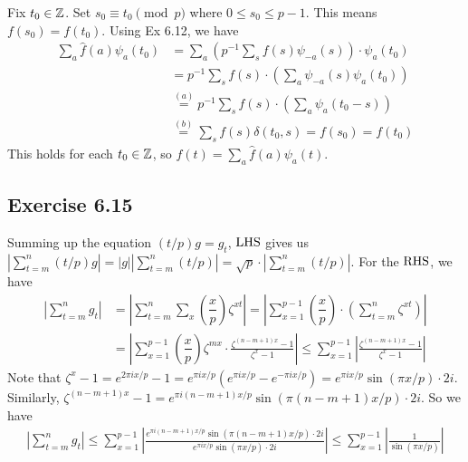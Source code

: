 \documentclass[../I&R.tex]{subfiles}
\begin{document}
Fix $t_0\in\mathbb{Z}$. Set $s_0\equiv t_0 \pmod{p}$ where $0\leq s_0\leq p-1$. This means $f(s_0)=f(t_0)$. Using Ex 6.12, we have
\begin{align*}
\sum_a \hat{f}(a)\psi_a(t_0) &= \sum_a\left(p^{-1}\sum_s f(s)\psi_{-a}(s)\right)\cdot\psi_a(t_0) \\
&= p^{-1} \sum_s f(s)\cdot\left(\sum_a \psi_{-a}(s)\psi_a(t_0)\right) \\
&\overset{(a)}{=} p^{-1} \sum_s f(s)\cdot\left(\sum_a \psi_a(t_0-s)\right) \\
&\overset{(b)}{=} \sum_s f(s)\delta(t_0,s) = f(s_0)=f(t_0)
\end{align*}
This holds for each $t_0\in\mathbb{Z}$, so $f(t)=\sum_a \hat{f}(a)\psi_a(t)$.

\subsection*{Exercise 6.15}

Summing up the equation $(t/p)g=g_t$, $\operatorname{LHS}$ gives us $|\sum_{t=m}^n (t/p)g|=|g||\sum_{t=m}^n (t/p)|=\sqrt{p}\cdot|\sum_{t=m}^n (t/p)|$. For the $\operatorname{RHS}$, we have
\begin{align*}
\left|\sum_{t=m}^n g_t\right| &= \left|\sum_{t=m}^n \sum_x \left(\dfrac{x}{p}\right)\zeta^{xt}\right| = \left| \sum_{x=1}^{p-1} \left(\dfrac{x}{p}\right)\cdot\left(\sum_{t=m}^n \zeta^{xt}\right) \right| \\
&= \left|\sum_{x=1}^{p-1} \left(\dfrac{x}{p}\right)\zeta^{mx}\cdot\frac{\zeta^{(n-m+1)x}-1}{\zeta^x-1}\right| \leq \sum_{x=1}^{p-1} \left|\frac{\zeta^{(n-m+1)x}-1}{\zeta^x-1}\right|
\end{align*}
Note that $\zeta^x-1=e^{2\pi ix/p}-1=e^{\pi ix/p}(e^{\pi ix/p}-e^{-\pi ix/p})=e^{\pi ix/p}\sin(\pi x/p)\cdot2i$. Similarly, $\zeta^{(n-m+1)x}-1=e^{\pi i(n-m+1)x/p}\sin(\pi(n-m+1)x/p)\cdot2i$. So we have
\begin{align*}
\left|\sum_{t=m}^n g_t\right| \leq \sum_{x=1}^{p-1} \left|\frac{e^{\pi i(n-m+1)x/p}\sin(\pi(n-m+1)x/p)\cdot2i}{e^{\pi ix/p}\sin(\pi x/p)\cdot2i}\right| \leq \sum_{x=1}^{p-1} \left|\frac{1}{\sin(\pi x/p)}\right|
\end{align*}
\end{document}
